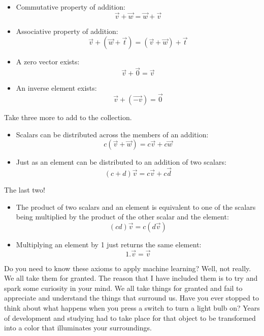 \documentclass[a4,12pt,twosided,openany]{memoir}
\begin{document}
\begin{tcolorbox}
\begin{itemize}
\item Commutative property of addition:
\[\overrightarrow{v} + \overrightarrow{w} = \overrightarrow{w} + \overrightarrow{v}\]
\item Associative property of addition:
\[\overrightarrow{v} + (\overrightarrow{w} +  \overrightarrow{t}) = (\overrightarrow{v} + \overrightarrow{w}) +  \overrightarrow{t}\]
\item A zero vector exists:
\[\overrightarrow{v} + \overrightarrow{0} = \overrightarrow{v}\]
\item An inverse element exists:
\[\overrightarrow{v} + (\overrightarrow{-v}) = \overrightarrow{0}\]
\end{itemize}
\end{tcolorbox}
Take three more to add to the collection.
\begin{tcolorbox}
\begin{itemize}
\item Scalars can be distributed across the members of an addition:
\[c( \overrightarrow{v} + \overrightarrow{w}) = c\overrightarrow{v} + c\overrightarrow{w}\]
\item Just as an element can be distributed to an addition of two scalars:
\[(c+d)\overrightarrow{v} = c\overrightarrow{v} + c \overrightarrow{d}\]
\end{itemize}
\end{tcolorbox}
The last two!
\begin{tcolorbox}
\begin{itemize}
\item The product of two scalars and an element is equivalent to one of the scalars being multiplied by the product of the other scalar and the element:
\[(cd)\overrightarrow{v} = c(d\overrightarrow{v})\]
\item Multiplying an element by 1 just returns the same element:
\[1.\overrightarrow{v} = \overrightarrow{v} \] 
\end{itemize}
\end{tcolorbox}
Do you need to know these axioms to apply machine learning? Well, not really. We all take them for granted. The reason that I have included them is to try and spark some curiosity in your mind. We all take things for granted and fail to appreciate and understand the things that surround us. Have you ever stopped to think about what happens when you press a switch to turn a light bulb on? Years of development and studying had to take place for that object to be transformed into a color that illuminates your surroundings.
\end{document}

